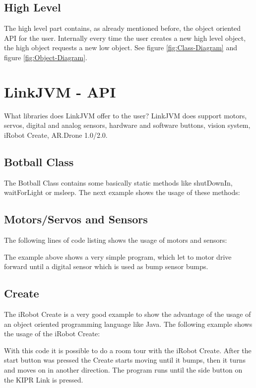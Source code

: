 \documentclass{juniorjournal}
\begin{document}
\subsection{High Level}
The high level part contains, as already mentioned before, the object oriented API for the user. 
Internally every time the user creates a new high level object, the high object requests a new low object.
See figure \ref{fig:Class-Diagram} and figure \ref{fig:Object-Diagram}.

\section{LinkJVM - API}
What libraries does LinkJVM offer to the user?
LinkJVM does support motors, servos, digital and analog sensors, hardware and 
software buttons, vision system, iRobot Create, AR.Drone 1.0/2.0.

\subsection{Botball Class}
The Botball Class contains some basically static methods like shutDownIn, 
waitForLight or msleep.
The next example shows the usage of these methods:


\subsection{Motors/Servos and Sensors}
The following lines of code listing shows the usage of motors and sensors:

The example above shows a very simple program, which let to motor drive forward 
until a digital sensor which is used as bump sensor bumps.

\subsection{Create}
The iRobot Create is a very good example to show the advantage of the usage of 
an object oriented programming language like Java.
The following example shows the usage of the iRobot Create:

With this code it is possible to do a room tour with the iRobot Create.
After the start button was pressed the Create starts moving until it bumps, then 
it turns and moves on in another direction. The program runs until the side 
button on the KIPR Link is pressed.
\end{document}
